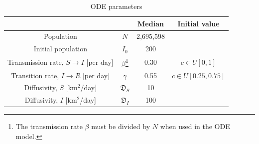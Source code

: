 \documentclass[11pt]{article}
\newcommand{\D}{\mathfrak{D}}
\begin{document}
\begin{savenotes}
\begin{table}[h]
	\centering
	\caption{ODE parameters}
	\label{tab:parameters}
	\begin{tabular}{ c c c c }
		\hline
		\hline
			&	&	Median	&	Initial value \\
		\hline
		Population	&	$N$	&	2,695,598 \\
		Initial population	&	$I_0$	&	200 \\
		Transmission rate, $S \rightarrow I$ [per day]	&	$\beta$\footnote{The transmission rate $\beta$ must be divided by $N$ when used in the ODE model.}	&	0.30	&	$c \in U[0,1]$ \\
		Transition rate, $I \rightarrow R$ [per day]	&	$\gamma$	&	0.55	&	$c \in U[0.25,0.75]$ \\
		Diffusivity, $S$ [km$^2$/day]	&	$\D_S$	&	10	&	\\
		Diffusivity, $I$ [km$^2$/day]	&	$\D_I$	&	100	&	\\
		\hline
		\hline
	\end{tabular}
\end{table}
\end{savenotes}




\end{document}
